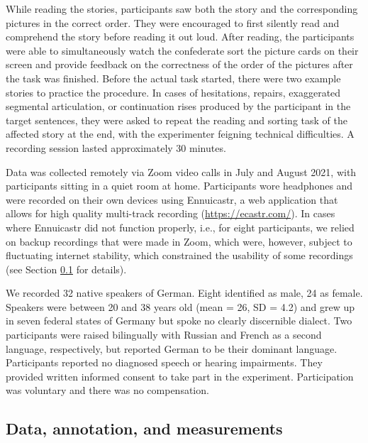 While reading the stories, participants saw both the story and the corresponding pictures in the correct order. They were encouraged to first silently read and comprehend the story before reading it out loud. After reading, the participants were able to simultaneously watch the confederate sort the picture cards on their screen and provide feedback on the correctness of the order of the pictures after the task was finished. Before the actual task started, there were two example stories to practice the procedure. In cases of hesitations, repairs, exaggerated segmental articulation, or continuation rises produced by the participant in the target sentences, they were asked to repeat the reading and sorting task of the affected story at the end, with the experimenter feigning technical difficulties. A recording session lasted approximately 30 minutes.
 
Data was collected remotely via Zoom video calls in July and August 2021, with participants sitting in a quiet room at home. Participants wore headphones and were recorded on their own devices using Ennuicastr, a web application that allows for high quality multi-track recording (\url{https://ecastr.com/}). In cases where Ennuicastr did not function properly, i.e., for eight participants, we relied on backup recordings that were made in Zoom, which were, however, subject to fluctuating internet stability, which constrained the usability of some recordings (see Section \ref{section: measurements study1} for details).

We recorded 32 native speakers of German. Eight identified as male, 24 as female. Speakers were between 20 and 38 years old (mean = 26, SD = 4.2) and grew up in seven federal states of Germany but spoke no clearly discernible dialect. Two participants were raised bilingually with Russian and French as a second language, respectively, but reported German to be their dominant language. Participants reported no diagnosed speech or hearing impairments. They provided written informed consent to take part in the experiment. Participation was voluntary and there was no compensation.

\subsection{Data, annotation, and measurements} \label{section: measurements study1}

